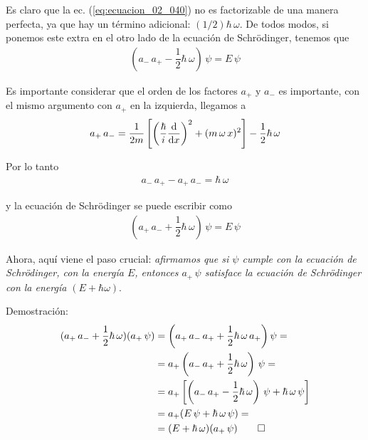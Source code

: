 Es claro que la ec. (\ref{eq:ecuacion_02_040}) no es factorizable de una manera perfecta, ya que hay un término adicional: $(1/2) \hbar \, \omega$. De todos modos, si ponemos este extra en el otro lado de la ecuación de Schrödinger, tenemos que
\begin{align}
(a_{-} \, a_{+} - \dfrac{1}{2} \hbar \, \omega) \, \psi = E \, \psi
\label{eq:ecuacion_02_43}
\end{align}

Es importante considerar que el orden de los factores $a_{+}$ y $a_{-}$ es importante, con el mismo argumento con $a_{+}$ en la izquierda, llegamos a
\begin{align}
a_{+} \, a_{-} = \dfrac{1}{2 m} \left[ \left( \dfrac{\hbar}{i} \dv{x} \right)^{2} + (m \, \omega \, x)^{2} \right] - \dfrac{1}{2} \hbar \, \omega
\label{eq:ecuacion_02_044}
\end{align}

Por lo tanto
\begin{align}
a_{-} \, a_{+} - a_{+} \, a_{-} = \hbar \, \omega
\label{eq:ecuacion_02_045}
\end{align}

y la ecuación de Schrödinger se puede escribir como
\begin{align}
(a_{+} \, a_{-} + \dfrac{1}{2} \hbar \, \omega) \, \psi = E \, \psi
\label{eq:ecuacion_02_046}
\end{align}

Ahora, aquí viene el paso crucial: \emph{afirmamos que si $\psi$ cumple con la ecuación de Schrödinger, con la energía $E$, entonces $a_{+} \, \psi$ satisface la ecuación de Schrödinger con la energía $(E + \hbar \omega)$}.
\par
Demostración:
\begin{align*}
(a_{+} \, a_{-} + \dfrac{1}{2} \hbar \, \omega) (a_{+} \, \psi) &= \left( a_{+} \, a_{-} \, a_{+} + \dfrac{1}{2} \hbar \, \omega \, a_{+} \right) \psi = \\
&= a_{+} \left( a_{-} \, a_{+} + \dfrac{1}{2} \hbar \, \omega \right) \, \psi = \\
&= a_{+} \left[ \left( a_{-} \, a_{+} - \dfrac{1}{2} \hbar \, \omega \right) \, \psi + \hbar \, \omega \, \psi \right] \\
&= a_{+} (E \, \psi + \hbar \, \omega \, \psi) = \\
&= (E + \hbar \, \omega) (a_{+} \, \psi) \qed
\end{align*}

